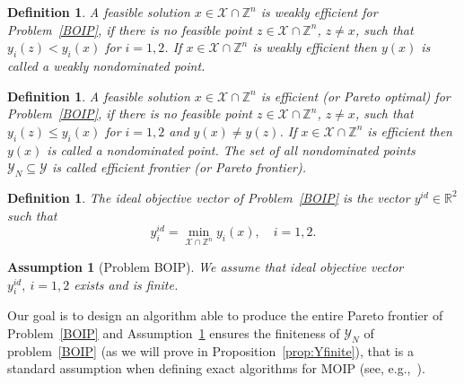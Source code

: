 \documentclass[preprint,12pt]{elsarticle}
\newtheorem{definition}[theorem]{Definition}
\newtheorem{assumption}[theorem]{Assumption}
\def\R{\mathbb{R}}
\def\Z{\mathbb{Z}}
\begin{document}
\begin{definition}
 A feasible solution $x \in \mathcal{X}\cap \Z^n$ is weakly efficient for Problem~\eqref{BOIP}, if there is no
 feasible point $z\in \mathcal{X}\cap \Z^n$, $z\neq x$, such that $y_i(z) < y_i(x)$ for $i=1,2$.
 If $x \in \mathcal{X}\cap \Z^n$ is weakly efficient then $y(x)$ is called a weakly nondominated point.
\end{definition}


\begin{definition}
A feasible solution $x \in \mathcal{X}\cap \Z^n$ is efficient (or Pareto optimal) for Problem~\eqref{BOIP}, if there is no feasible point $z\in \mathcal{X}\cap \Z^n$, $z\neq x$,
such that $y_i(z) \leq y_i(x)$ for $i=1,2$ and $y(x) \neq y(z)$. If $x \in \mathcal{X}\cap \Z^n$ is efficient then $y(x)$ is called a nondominated point.
 The set of all nondominated points $\mathcal{Y}_N\subseteq \mathcal{Y}$ is called efficient frontier (or Pareto frontier).
\end{definition}

\begin{definition}\label{def:ideal}
 The \emph{ideal} objective vector of Problem~\eqref{BOIP} is the vector $y^{id}\in \R^2$ such that
 \[y_i^{id} = \min_{\mathcal{X}\cap \Z^n} y_i(x), \quad i=1,2.\]\end{definition}


\begin{assumption}[Problem BOIP]\label{ass:boip}
We assume that ideal objective vector $y_i^{id},\  i=1,2$
exists  and is finite.
\end{assumption}




Our goal is to design an algorithm able to produce the entire Pareto frontier of Problem~\eqref{BOIP} and
Assumption~\ref{ass:boip} ensures the finiteness of $\mathcal{Y}_N$ of problem~\eqref{BOIP} (as we will prove in
Proposition~\ref{prop:Yfinite}), that is a standard assumption when defining exact algorithms for MOIP (see, e.g.,~\cite{ralphs2006improved}).
\end{document}

